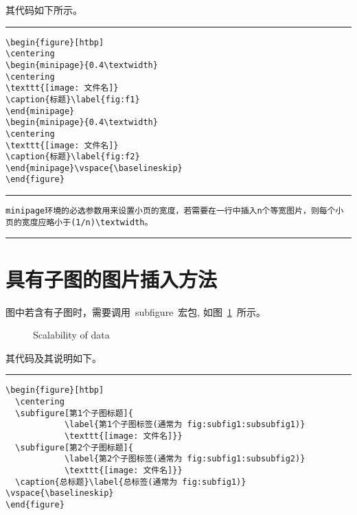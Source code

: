 其代码如下所示。
\vspace{1em}\noindent\hrule
\begin{verbatim}
\begin{figure}[htbp]
\centering
\begin{minipage}{0.4\textwidth}
\centering
\texttt{[image: 文件名]}
\caption{标题}\label{fig:f1}
\end{minipage}
\begin{minipage}{0.4\textwidth}
\centering
\texttt{[image: 文件名]}
\caption{标题}\label{fig:f2}
\end{minipage}\vspace{\baselineskip}
\end{figure}
\end{verbatim}

\noindent\hrule

\begin{verbatim}
minipage环境的必选参数用来设置小页的宽度，若需要在一行中插入n个等宽图片，则每个小页的宽度应略小于(1/n)\textwidth。
\end{verbatim}

\noindent\hrule

\section{具有子图的图片插入方法}

图中若含有子图时，需要调用~subfigure~宏包, 如图~\ref{fig:subfig}~所示。
\begin{figure}[htbp]
  \centering
  \caption{Scalability of data}\label{fig:subfig}
\vspace{\baselineskip}
\end{figure}

其代码及其说明如下。
\vspace{1em}\noindent\hrule

\begin{verbatim}
\begin{figure}[htbp]
  \centering
  \subfigure[第1个子图标题]{
            \label{第1个子图标签(通常为 fig:subfig1:subsubfig1)}
            \texttt{[image: 文件名]}}
  \subfigure[第2个子图标题]{
            \label{第2个子图标签(通常为 fig:subfig1:subsubfig2)}
            \texttt{[image: 文件名]}}
  \caption{总标题}\label{总标签(通常为 fig:subfig1)}
\vspace{\baselineskip}
\end{figure}
\end{verbatim}

